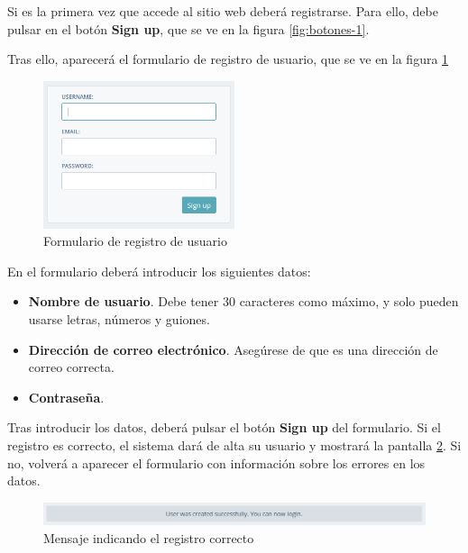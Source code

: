 Si es la primera vez que accede al sitio web deberá registrarse. Para ello, debe
pulsar en el botón \textbf{Sign up}, que se ve en la figura \ref{fig:botones-1}.

Tras ello, aparecerá el formulario de registro de usuario, que se ve en la
figura \ref{fig:registro}

\begin{figure}[hbtp]
  \centering
  \includegraphics[width=0.5\textwidth]{apendice_manual_usuario/formulario_registro.png}
  \caption{Formulario de registro de usuario}
  \label{fig:registro}
\end{figure}

En el formulario deberá introducir los siguientes datos:

\begin{itemize}
\item \textbf{Nombre de usuario}. Debe tener 30 caracteres como máximo, y solo
  pueden usarse letras, números y guiones.
\item \textbf{Dirección de correo electrónico}. Asegúrese de que es una
  dirección de correo correcta.
\item \textbf{Contraseña}.
\end{itemize}

Tras introducir los datos, deberá pulsar el botón \textbf{Sign up} del
formulario. Si el registro es correcto, el sistema dará de alta su usuario y
mostrará la pantalla \ref{fig:registro-correcto}. Si no, volverá a aparecer el
formulario con información sobre los errores en los datos.

\begin{figure}[hbtp]
  \centering
  \includegraphics[width=\textwidth]{apendice_manual_usuario/pantalla_register_completo.png}
  \caption{Mensaje indicando el registro correcto}
  \label{fig:registro-correcto}
\end{figure}

